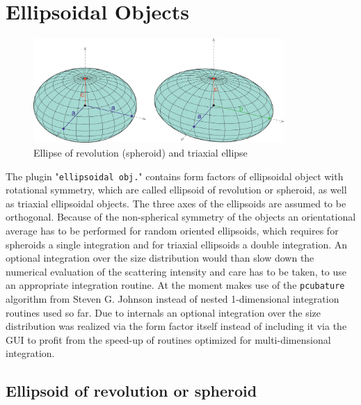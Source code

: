 \clearpage
\section{Ellipsoidal Objects}
\label{sect:EllipsoidalObjects}
\begin{figure}[htb]
\begin{center}
\includegraphics[width=0.85\textwidth]{../images/form_factor/Ellipsoid/Ellipsoide.png}
\end{center}
\caption{Ellipse of revolution (spheroid) and triaxial ellipse}
\label{fig:EllipsoidalObjects}
\end{figure}

The plugin "\texttt{ellipsoidal obj.}" contains form factors of ellipsoidal object with rotational symmetry, which are called ellipsoid of revolution or spheroid, as well as triaxial ellipsoidal objects. The three axes of the ellipsoids are assumed to be orthogonal. Because of the non-spherical symmetry of the objects an orientational average has to be performed for random oriented ellipsoids, which requires for spheroids a single integration and for triaxial ellipsoids a double integration. An optional integration over the size distribution would than slow down the numerical evaluation of the scattering intensity and care has to be taken, to use an appropriate integration routine. At the moment \SASfit makes use of the \texttt{pcubature} algorithm from Steven G. Johnson \cite{Johnson2017} instead of nested 1-dimensional integration routines used so far. Due to \SASfit internals an optional integration over the size distribution was realized via the form factor itself instead of including it via the GUI to profit from the speed-up of routines optimized for multi-dimensional integration.

\subsection{Ellipsoid of revolution or spheroid}
\label{sec:Spheroid}~\\

